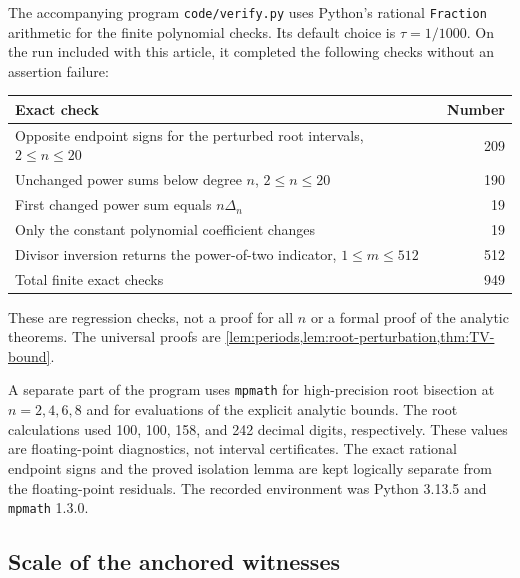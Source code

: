\documentclass[11pt,a4paper]{article}
\numberwithin{equation}{section}
\theoremstyle{definition}
\theoremstyle{remark}
\begin{document}
The accompanying program \texttt{code/verify.py} uses Python's rational
\texttt{Fraction} arithmetic for the finite polynomial checks. Its default
choice is $\tau=1/1000$. On the run included with this article, it completed
the following checks without an assertion failure:
\begin{center}
\begin{tabular}{@{}lr@{}}
\toprule
Exact check & Number\\
\midrule
Opposite endpoint signs for the perturbed root intervals, $2\le n\le20$ & 209\\
Unchanged power sums below degree $n$, $2\le n\le20$ & 190\\
First changed power sum equals $n\Delta_n$ & 19\\
Only the constant polynomial coefficient changes & 19\\
Divisor inversion returns the power-of-two indicator, $1\le m\le512$ & 512\\
\midrule
Total finite exact checks & 949\\
\bottomrule
\end{tabular}
\end{center}
These are regression checks, not a proof for all $n$ or a formal proof of
the analytic theorems. The universal proofs are
\cref{lem:periods,lem:root-perturbation,thm:TV-bound}.

A separate part of the program uses \texttt{mpmath} for high-precision root
bisection at $n=2,4,6,8$ and for evaluations of the explicit analytic bounds.
The root calculations used 100, 100, 158, and 242 decimal digits,
respectively. These values are floating-point diagnostics, not interval
certificates. The exact rational endpoint signs and the proved isolation
lemma are kept logically separate from the floating-point residuals.
The recorded environment was Python 3.13.5 and \texttt{mpmath} 1.3.0.

\subsection{Scale of the anchored witnesses}
\end{document}
